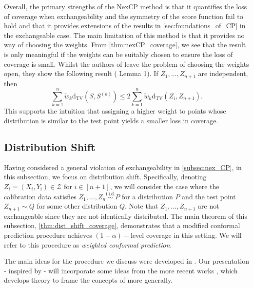 \documentclass[11pt, titlepage]{article} %
\newcommand{\R}{\mathrm}
\numberwithin{equation}{section}
\theoremstyle{definition}
\numberwithin{theorem}{section}
\numberwithin{lemma}{section}
\numberwithin{corollary}{section}
\numberwithin{proposition}{section}
\numberwithin{definition}{section}
\numberwithin{remark}{section}
\begin{document}
\noindent
Overall, the primary strengths of the NexCP method is that it quantifies the loss of coverage when exchangeability and the symmetry of the score function fail to hold and that it provides extensions of the results in \cref{sec:foundations_of_CP} in the exchangeable case. The main limitation of this method is that it provides no way of choosing the weights. From \cref{thm:nexCP_coverage}, we see that the result is only meaningful if the weights can be suitably chosen to ensure the loss of coverage is small. Whilst the authors of \cite{barber2023conformalbeyondexch} leave the problem of choosing the weights open, they show the following result (\cite{barber2023conformalbeyondexch} Lemma 1). If \(Z_1, \ldots, Z_{n+1}\) are independent, then \[\sum_{k=1}^{n} \tilde{w}_k \R{d_{TV}}(S, S^{(k)}) \leq 2 \sum_{k=1}^{n} \tilde{w}_k \R{d_{TV}}(Z_i, Z_{n+1}).\] This supports the intuition that assigning a higher weight to points whose distribution is similar to the test point yields a smaller loss in coverage.

\subsection{Distribution Shift}
\label{subsec:dist_shift}

Having considered a general violation of exchangeability in \cref{subsec:nex_CP}, in this subsection, we focus on distribution shift. Specifically, denoting \(Z_i = (X_i, Y_i) \in \mathcal{Z}\) for \(i \in [n+1]\), we will consider the case where the calibration data satisfies \(Z_1, \ldots, Z_n \overset{\R{i.i.d.}}{\sim} P\) for a distribution \(P\) and the test point \(Z_{n+1} \sim Q\) for some other distribution \(Q\). Note that \(Z_1, \ldots, Z_{n+1}\) are not exchangeable since they are not identically distributed. The main theorem of this subsection, \cref{thm:dist_shift_coverage}, demonstrates that a modified conformal prediction procedure achieves \((1-\alpha)-\)level coverage in this setting. We will refer to this procedure as \textit{weighted conformal prediction}. \vskip5pt

\noindent
The main ideas for the procedure we discuss were developed in \cite{tibshirani2019covariateshift, ramdas2021labelshift}. Our presentation - inspired by \cite{angelopoulos2024theoreticalfoundationsconformalprediction} - will incorporate some ideas from the more recent works \cite{barber2024finetti,tang2023finiteweighted}, which develops theory to frame the concepts of \cite{tibshirani2019covariateshift,ramdas2021labelshift} more generally. \vskip5pt
\end{document}
